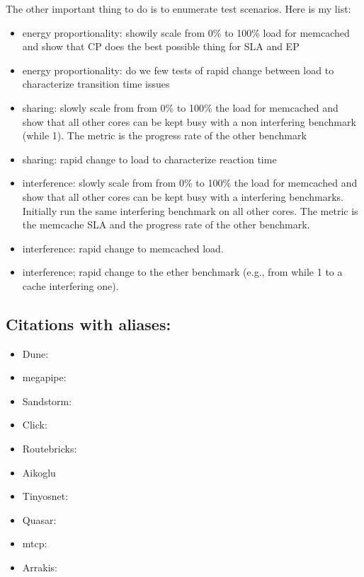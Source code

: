 The other important thing to do is to enumerate test scenarios. Here is my list:
\begin{itemize}

\item energy proportionality: showily scale from 0\% to 100\% load for
  memcached and show that CP does the best possible thing for SLA and
  EP

\item energy proportionality: do we few tests of rapid change between load to characterize transition time issues
\item  sharing: slowly scale from from 0\% to 100\% the load for memcached and show that all other cores can be kept busy with a non interfering benchmark (while 1). The metric is the progress rate of the other benchmark

\item sharing: rapid change to load to characterize reaction time

\item interference: slowly scale from from 0\% to 100\% the load for memcached and show that all other cores can be kept busy with a interfering benchmarks. Initially run the same interfering benchmark on all other cores. The metric is the memcache SLA and the progress rate of the other benchmark. 

\item interference: rapid change to memcached load. 
\item interference; rapid change to the ether benchmark (e.g., from while 1 to a cache interfering one). 
\end{itemize}


\subsection{Citations with aliases:}


\begin{itemize}
\item Dune: \cite{dune}
\item megapipe: \cite{megapipe}
\item Sandstorm: \cite{sandstorm}
\item Click: \cite{click}
\item Routebricks: \cite{routebricks}
\item Aikoglu \cite{Atikoglu:2012:WAL}
\item Tinyosnet: \cite{tinyosnet}
\item Quasar: \cite{quasar}
\item mtcp: \cite{mtcp}
\item Arrakis: \cite{arrakis-osdi}
\end{itemize}

